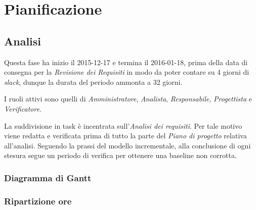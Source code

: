 \section{Pianificazione}
\subsection{Analisi}
Questa fase ha inizio il 2015-12-17 e termina il 2016-01-18, prima della data di consegna per la \textit{Revisione dei Requisiti} in modo da poter contare su 4 giorni di \textit{slack}, dunque la durata del periodo ammonta a 32 giorni.

I ruoli attivi sono quelli di \textit{Amministratore}, \textit{Analista}, \textit{Responsabile}, \textit{Progettista} e \textit{Verificatore}.

La suddivisione in task \`e incentrata sull'\textit{Analisi dei requisiti}. Per tale motivo viene redatta e verificata prima di tutto la parte del \textit{Piano di progetto} relativa all'analisi. Seguendo la prassi del modello incrementale, alla conclusione di ogni stesura segue un periodo di verifica per ottenere una baseline non corrotta.
\subsubsection{Diagramma di Gantt}

\subsubsection{Ripartizione ore}

